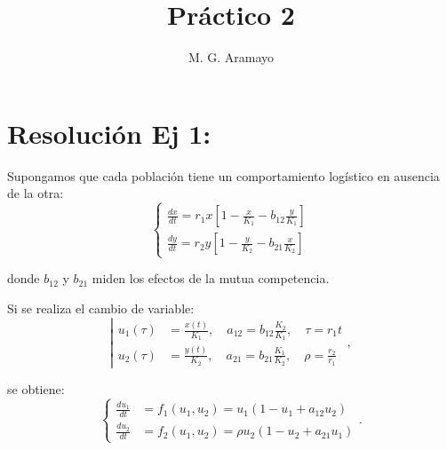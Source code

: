\documentclass[twocolumn,aps,prl]{revtex4-1}
\begin{document}

\title{Práctico 2}
\author{M. G. Aramayo}


\maketitle



\section{Resolución Ej 1:}

Supongamos que cada población tiene un comportamiento logístico en ausencia de la otra:
$$
\left\{
\begin{aligned}
    \frac{d x}{d t}=r_{1} x\left[1-\frac{x}{K_{1}}-b_{12} \frac{y}{K_{1}}\right] \\
    \frac{d y}{d t}=r_{2} y\left[1-\frac{y}{K_{2}}-b_{21} \frac{x}{K_{2}}\right]
\end{aligned}
\right.
$$

donde $b_{12}$ y $b_{21}$ miden los efectos de la mutua competencia. 

Si se realiza el cambio de variable:
\begin{equation} \label{eq:cambio de variable}
\left\lvert 
    \begin{aligned}
    u_1(\tau) &= \frac{x(t)}{K_{1}}, \quad a_{12} = b_{12} \frac{K_{2}}{K_{1}}, \quad \tau=r_{1} t \\
    u_2(\tau) &= \frac{y(t)}{K_{2}}, \quad a_{21} = b_{21} \frac{K_{1}}{K_{2}}, \quad \rho=\frac{r_{2}}{r_{1}}
    \end{aligned}
\right. ,
\end{equation}

se obtiene:
\begin{equation} \label{eq:adimenzionalizada}
\left\{
\begin{aligned}
    \frac{d u_{1}}{d t} &= f_{1}\left(u_{1}, u_{2}\right) = u_{1}\left(1-u_{1}+a_{12} u_{2}\right) \\
    \frac{d u_{2}}{d t} &= f_{2}\left(u_{1}, u_{2}\right) = \rho u_{2}\left(1-u_{2}+a_{21} u_{1}\right)
\end{aligned}
\right.  .  
\end{equation}
\end{document}
